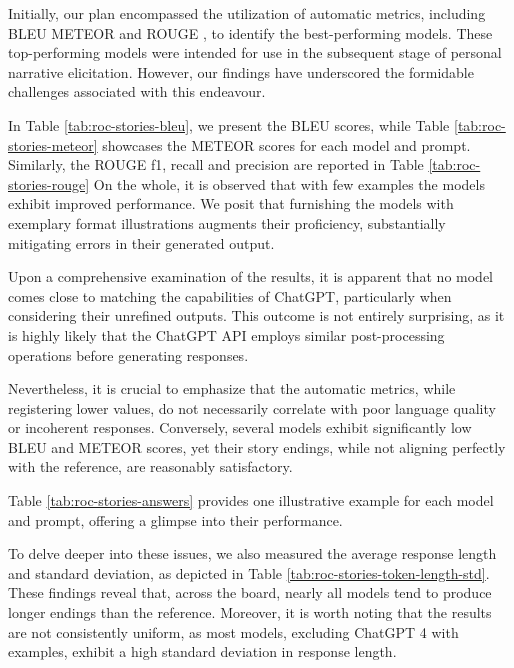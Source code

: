 Initially, our plan encompassed the utilization of automatic metrics, including BLEU \cite{bleu} METEOR \cite{meteor} and ROUGE \cite{rouge}, to identify the best-performing models. These top-performing models were intended for use in the subsequent stage of personal narrative elicitation. However, our findings have underscored the formidable challenges associated with this endeavour.



In Table \ref{tab:roc-stories-bleu}, we present the BLEU scores, while Table \ref{tab:roc-stories-meteor} showcases the METEOR scores for each model and prompt. Similarly, the ROUGE f1, recall and precision are reported in Table \ref{tab:roc-stories-rouge} On the whole, it is observed that with few examples the models exhibit improved performance. We posit that furnishing the models with exemplary format illustrations augments their proficiency, substantially mitigating errors in their generated output.

Upon a comprehensive examination of the results, it is apparent that no model comes close to matching the capabilities of ChatGPT, particularly when considering their unrefined outputs. This outcome is not entirely surprising, as it is highly likely that the ChatGPT API employs similar post-processing operations before generating responses.

Nevertheless, it is crucial to emphasize that the automatic metrics, while registering lower values, do not necessarily correlate with poor language quality or incoherent responses. Conversely, several models exhibit significantly low BLEU and METEOR scores, yet their story endings, while not aligning perfectly with the reference, are reasonably satisfactory.

Table \ref{tab:roc-stories-answers} provides one illustrative example for each model and prompt, offering a glimpse into their performance.

% 
To delve deeper into these issues, we also measured the average response length and standard deviation, as depicted in Table \ref{tab:roc-stories-token-length-std}. These findings reveal that, across the board, nearly all models tend to produce longer endings than the reference. Moreover, it is worth noting that the results are not consistently uniform, as most models, excluding ChatGPT 4 with examples, exhibit a high standard deviation in response length.


